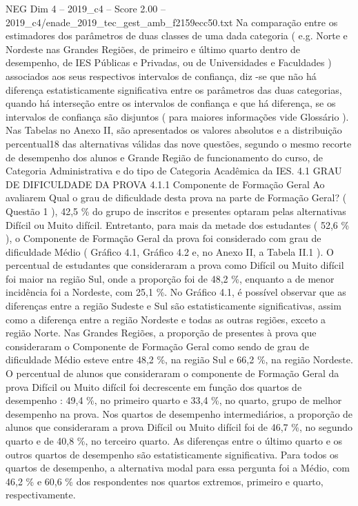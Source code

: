 \begin{textsample}{NEG Dim 4 – 2019\_c4 – Score 2.00 – 2019\_c4/enade\_2019\_tec\_gest\_amb\_f2159ecc50.txt}
Na comparação entre os estimadores dos parâmetros de duas classes de uma dada categoria ( e.g.
Norte e Nordeste nas Grandes Regiões, de primeiro e último quarto dentro de desempenho, de IES Públicas e Privadas, ou de Universidades e Faculdades ) associados aos seus respectivos intervalos de confiança, diz -se que não há diferença estatisticamente significativa entre os parâmetros das duas categorias, quando há interseção entre os intervalos de confiança e que há diferença, se os intervalos de confiança são disjuntos ( para maiores informações vide Glossário ).
Nas Tabelas no Anexo II, são apresentados os valores absolutos e a distribuição percentual18 das alternativas válidas das nove questões, segundo o mesmo recorte de desempenho dos alunos e Grande Região de funcionamento do curso, de Categoria Administrativa e do tipo de Categoria Acadêmica da IES. 4.1 GRAU DE DIFICULDADE DA PROVA 4.1.1 Componente de Formação Geral Ao avaliarem Qual o grau de dificuldade desta prova na parte de Formação Geral? ( Questão 1 ), 42,5 \% do grupo de inscritos e presentes optaram pelas alternativas Difícil ou Muito difícil.
Entretanto, para mais da metade dos estudantes ( 52,6 \% ), o Componente de Formação Geral da prova foi considerado com grau de dificuldade Médio ( Gráfico 4.1, Gráfico 4.2 e, no Anexo II, a Tabela II.1 ).
O percentual de estudantes que consideraram a prova como Difícil ou Muito difícil foi maior na região Sul, onde a proporção foi de 48,2 \%, enquanto a de menor incidência foi a Nordeste, com 25,1 \%.
No Gráfico 4.1, é possível observar que as diferenças entre a região Sudeste e Sul são estatisticamente significativas, assim como a diferença entre a região Nordeste e todas as outras regiões, exceto a região Norte.
Nas Grandes Regiões, a proporção de presentes à prova que consideraram o Componente de Formação Geral como sendo de grau de dificuldade Médio esteve entre 48,2 \%, na região Sul e 66,2 \%, na região Nordeste.
O percentual de alunos que consideraram o componente de Formação Geral da prova Difícil ou Muito difícil foi decrescente em função dos quartos de desempenho : 49,4 \%, no primeiro quarto e 33,4 \%, no quarto, grupo de melhor desempenho na prova.
Nos quartos de desempenho intermediários, a proporção de alunos que consideraram a prova Difícil ou Muito difícil foi de 46,7 \%, no segundo quarto e de 40,8 \%, no terceiro quarto.
As diferenças entre o último quarto e os outros quartos de desempenho são estatisticamente significativa.
Para todos os quartos de desempenho, a alternativa modal para essa pergunta foi a Médio, com 46,2 \% e 60,6 \% dos respondentes nos quartos extremos, primeiro e quarto, respectivamente.

\end{textsample}
